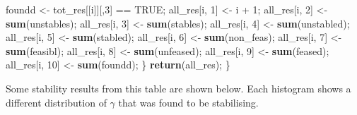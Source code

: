 \documentclass[]{article}
\newenvironment{Shaded}{\begin{snugshade}}{\end{snugshade}}
\newcommand{\KeywordTok}[1]{\textcolor[rgb]{0.13,0.29,0.53}{\textbf{{#1}}}}
\newcommand{\DecValTok}[1]{\textcolor[rgb]{0.00,0.00,0.81}{{#1}}}
\newcommand{\StringTok}[1]{\textcolor[rgb]{0.31,0.60,0.02}{{#1}}}
\newcommand{\OtherTok}[1]{\textcolor[rgb]{0.56,0.35,0.01}{{#1}}}
\newcommand{\NormalTok}[1]{{#1}}
\begin{document}
\begin{Shaded}
\begin{Highlighting}[]
        \NormalTok{foundd    <-}\StringTok{ }\NormalTok{tot_res[[i]][,}\DecValTok{3}\NormalTok{] ==}\StringTok{ }\OtherTok{TRUE}\NormalTok{;}
        \NormalTok{all_res[i, }\DecValTok{1}\NormalTok{]  <-}\StringTok{ }\NormalTok{i +}\StringTok{ }\DecValTok{1}\NormalTok{;}
        \NormalTok{all_res[i, }\DecValTok{2}\NormalTok{]  <-}\StringTok{ }\KeywordTok{sum}\NormalTok{(unstables);}
        \NormalTok{all_res[i, }\DecValTok{3}\NormalTok{]  <-}\StringTok{ }\KeywordTok{sum}\NormalTok{(stables);}
        \NormalTok{all_res[i, }\DecValTok{4}\NormalTok{]  <-}\StringTok{ }\KeywordTok{sum}\NormalTok{(unstabled);}
        \NormalTok{all_res[i, }\DecValTok{5}\NormalTok{]  <-}\StringTok{ }\KeywordTok{sum}\NormalTok{(stabled);}
        \NormalTok{all_res[i, }\DecValTok{6}\NormalTok{]  <-}\StringTok{ }\KeywordTok{sum}\NormalTok{(non_feas);}
        \NormalTok{all_res[i, }\DecValTok{7}\NormalTok{]  <-}\StringTok{ }\KeywordTok{sum}\NormalTok{(feasibl);}
        \NormalTok{all_res[i, }\DecValTok{8}\NormalTok{]  <-}\StringTok{ }\KeywordTok{sum}\NormalTok{(unfeased);}
        \NormalTok{all_res[i, }\DecValTok{9}\NormalTok{]  <-}\StringTok{ }\KeywordTok{sum}\NormalTok{(feased);}
        \NormalTok{all_res[i, }\DecValTok{10}\NormalTok{] <-}\StringTok{ }\KeywordTok{sum}\NormalTok{(foundd);}
    \NormalTok{\}}
    \KeywordTok{return}\NormalTok{(all_res);}
\NormalTok{\}}
\end{Highlighting}
\end{Shaded}

Some stability results from this table are shown below. Each histogram
shows a different distribution of \(\gamma\) that was found to be
stabilising.
\end{document}
